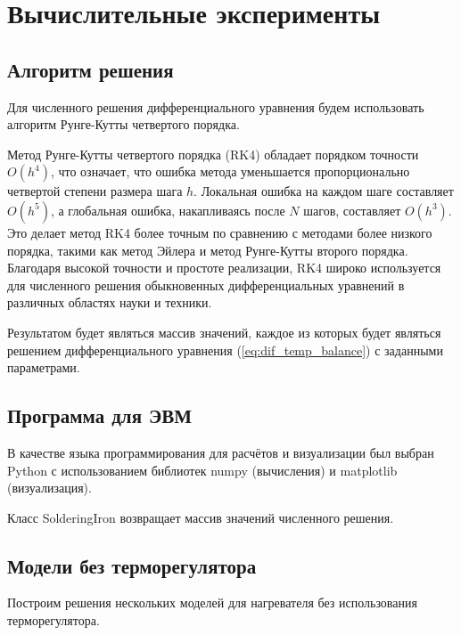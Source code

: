 \chapter{Вычислительные эксперименты}
\section{Алгоритм решения}

Для численного решения дифференциального уравнения будем использовать алгоритм Рунге-Кутты \cite{1964calculus} четвертого порядка. 

Метод Рунге-Кутты четвертого порядка (RK4) обладает порядком точности \( O(h^4) \), что означает, что ошибка метода уменьшается пропорционально четвертой степени размера шага \( h \). Локальная ошибка на каждом шаге составляет \( O(h^5) \), а глобальная ошибка, накапливаясь после \( N \) шагов, составляет \( O(h^3) \). Это делает метод RK4 более точным по сравнению с методами более низкого порядка, такими как метод Эйлера и метод Рунге-Кутты второго порядка. Благодаря высокой точности и простоте реализации, RK4 широко используется для численного решения обыкновенных дифференциальных уравнений в различных областях науки и техники.

Результатом будет являться массив значений, каждое из которых будет являться решением дифференциального уравнения (\ref{eq:dif_temp_balance}) с заданными параметрами.

\section{Программа для ЭВМ}

В качестве языка программирования для расчётов и визуализации был выбран Python с использованием библиотек numpy (вычисления) и matplotlib (визуализация).

 

Класс SolderingIron возвращает массив значений численного решения.

\newpage
\section{Модели без терморегулятора}

Построим решения нескольких моделей для нагревателя без использования терморегулятора.

